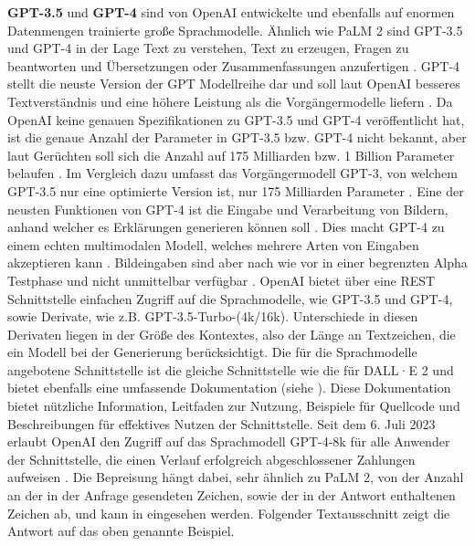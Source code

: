 \textbf{GPT-3.5} \cite{openai-gpt-sep-2021} und \textbf{GPT-4} \cite{openai-gpt-sep-2021} sind von OpenAI entwickelte und ebenfalls auf enormen Datenmengen trainierte große Sprachmodelle.
Ähnlich wie PaLM 2 sind GPT-3.5 und GPT-4 in der Lage Text zu verstehen, Text zu erzeugen, Fragen zu beantworten und Übersetzungen oder Zusammenfassungen anzufertigen \cite{gpt3-paper}.
GPT-4 stellt die neuste Version der GPT Modellreihe dar und soll laut OpenAI besseres Textverständnis und eine höhere Leistung als die Vorgängermodelle liefern \cite{openai-gpt-4-announcement}.
Da OpenAI keine genauen Spezifikationen zu GPT-3.5 und GPT-4 veröffentlicht hat, ist die genaue Anzahl der Parameter in GPT-3.5 bzw. GPT-4 nicht bekannt, aber laut Gerüchten soll sich die Anzahl auf 175 Milliarden bzw. 1 Billion Parameter belaufen \cite{decoder-gpt-4-parameter-count}.
Im Vergleich dazu umfasst das Vorgängermodell GPT-3, von welchem GPT-3.5 nur eine optimierte Version ist, nur 175 Milliarden Parameter \cite{gpt3-paper}.
Eine der neusten Funktionen von GPT-4 ist die Eingabe und Verarbeitung von Bildern, anhand welcher es Erklärungen generieren können soll \cite{openai-gpt-4-announcement}.
Dies macht GPT-4 zu einem echten multimodalen Modell, welches mehrere Arten von Eingaben akzeptieren kann \cite{openai-gpt-4-announcement}.
Bildeingaben sind aber nach wie vor in einer begrenzten Alpha Testphase und nicht unmittelbar verfügbar \cite{openai-gpt-4-announcement}.
OpenAI bietet über eine REST Schnittstelle einfachen Zugriff auf die Sprachmodelle, wie GPT-3.5 und GPT-4, sowie Derivate, wie z.B. GPT-3.5-Turbo-(4k/16k).
Unterschiede in diesen Derivaten liegen in der Größe des Kontextes, also der Länge an Textzeichen, die ein Modell bei der Generierung berücksichtigt.
Die für die Sprachmodelle angebotene Schnittstelle ist die gleiche Schnittstelle wie die für DALL·E 2 und bietet ebenfalls eine umfassende Dokumentation (siehe \cite{openai-api-doc}).
Diese Dokumentation bietet nützliche Information, Leitfaden zur Nutzung, Beispiele für Quellcode und Beschreibungen für effektives Nutzen der Schnittstelle.
Seit dem 6. Juli 2023 erlaubt OpenAI den Zugriff auf das Sprachmodell GPT-4-8k für alle Anwender der Schnittstelle, die einen Verlauf erfolgreich abgeschlossener Zahlungen aufweisen \cite{openai-gpt4-access}.
Die Bepreisung hängt dabei, sehr ähnlich zu PaLM 2, von der Anzahl an der in der Anfrage gesendeten Zeichen, sowie der in der Antwort enthaltenen Zeichen ab, und kann in \cite{openai-pricing} eingesehen werden.
Folgender Textausschnitt zeigt die Antwort auf das oben genannte Beispiel.

